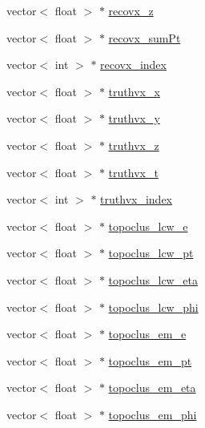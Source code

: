 \begin{DoxyCompactItemize}
\item 
vector$<$ float $>$ $\ast$ \hyperlink{classJetAnalysisExample_a7d0c671d9c94feee93b3d90db2ca6ecb}{recovx\+\_\+z}
\item 
vector$<$ float $>$ $\ast$ \hyperlink{classJetAnalysisExample_a266fb2c9711d2163c38f9a3d9693109d}{recovx\+\_\+sum\+Pt}
\item 
vector$<$ int $>$ $\ast$ \hyperlink{classJetAnalysisExample_ac70f479dc15af603b41298ff3c13f364}{recovx\+\_\+index}
\item 
vector$<$ float $>$ $\ast$ \hyperlink{classJetAnalysisExample_a2235f67428cfeb0739952fe6e5e0c38d}{truthvx\+\_\+x}
\item 
vector$<$ float $>$ $\ast$ \hyperlink{classJetAnalysisExample_a6fa561bc751d7929b49ce2934e5f1d18}{truthvx\+\_\+y}
\item 
vector$<$ float $>$ $\ast$ \hyperlink{classJetAnalysisExample_a65f8308c4d303269e54abd21818bc872}{truthvx\+\_\+z}
\item 
vector$<$ float $>$ $\ast$ \hyperlink{classJetAnalysisExample_a4a16d94169eab5a69b31ba5d87688e7e}{truthvx\+\_\+t}
\item 
vector$<$ int $>$ $\ast$ \hyperlink{classJetAnalysisExample_a5c728f837436bffd463f5d5e51361112}{truthvx\+\_\+index}
\item 
vector$<$ float $>$ $\ast$ \hyperlink{classJetAnalysisExample_a9d3e47465482731338a5dabaed8677e3}{topoclus\+\_\+lcw\+\_\+e}
\item 
vector$<$ float $>$ $\ast$ \hyperlink{classJetAnalysisExample_ac61c4081e8c5048bf6bb1b50cd0aad05}{topoclus\+\_\+lcw\+\_\+pt}
\item 
vector$<$ float $>$ $\ast$ \hyperlink{classJetAnalysisExample_ac982f028ae799f4e23bc7f1170cff73d}{topoclus\+\_\+lcw\+\_\+eta}
\item 
vector$<$ float $>$ $\ast$ \hyperlink{classJetAnalysisExample_a8623d598ac847beb253b15788e18920a}{topoclus\+\_\+lcw\+\_\+phi}
\item 
vector$<$ float $>$ $\ast$ \hyperlink{classJetAnalysisExample_a42e3041131fba037a43f390dfc6bbf6a}{topoclus\+\_\+em\+\_\+e}
\item 
vector$<$ float $>$ $\ast$ \hyperlink{classJetAnalysisExample_ac6a43d26656f09f58fd4e154ae93b87a}{topoclus\+\_\+em\+\_\+pt}
\item 
vector$<$ float $>$ $\ast$ \hyperlink{classJetAnalysisExample_a285176200a1708ee9b2294bc64c8caa5}{topoclus\+\_\+em\+\_\+eta}
\item 
vector$<$ float $>$ $\ast$ \hyperlink{classJetAnalysisExample_af7b611e126dcb7a438c8f3fdd22f3f33}{topoclus\+\_\+em\+\_\+phi}

\end{DoxyCompactItemize}
